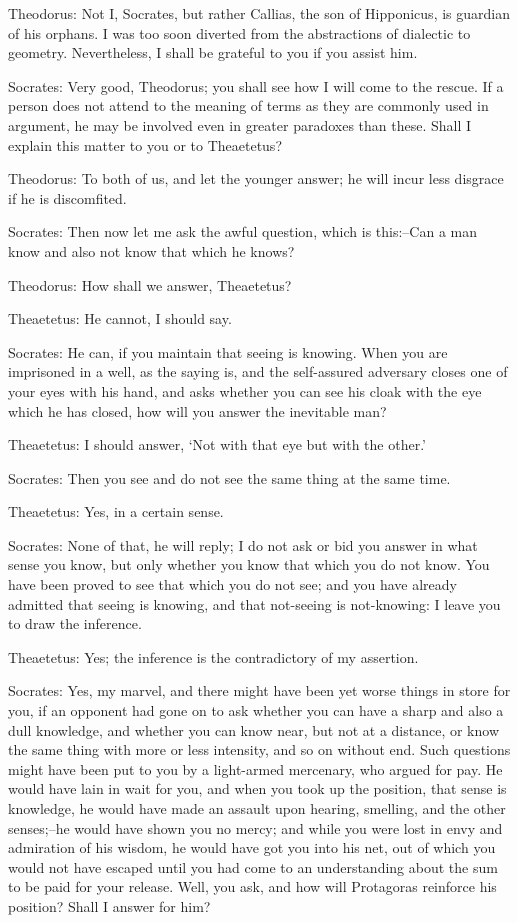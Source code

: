 Theodorus: Not I, Socrates, but rather Callias, the son of Hipponicus,
is guardian of his orphans. I was too soon diverted from the
abstractions of dialectic to geometry. Nevertheless, I shall be grateful
to you if you assist him.

Socrates: Very good, Theodorus; you shall see how I will come to the
rescue. If a person does not attend to the meaning of terms as they are
commonly used in argument, he may be involved even in greater paradoxes
than these. Shall I explain this matter to you or to Theaetetus?

Theodorus: To both of us, and let the younger answer; he will incur less
disgrace if he is discomfited.

Socrates: Then now let me ask the awful question, which is this:--Can a
man know and also not know that which he knows?

Theodorus: How shall we answer, Theaetetus?

Theaetetus: He cannot, I should say.

Socrates: He can, if you maintain that seeing is knowing. When you are
imprisoned in a well, as the saying is, and the self-assured adversary
closes one of your eyes with his hand, and asks whether you can see
his cloak with the eye which he has closed, how will you answer the
inevitable man?

Theaetetus: I should answer, `Not with that eye but with the other.'

Socrates: Then you see and do not see the same thing at the same time.

Theaetetus: Yes, in a certain sense.

Socrates: None of that, he will reply; I do not ask or bid you answer
in what sense you know, but only whether you know that which you do not
know. You have been proved to see that which you do not see; and you
have already admitted that seeing is knowing, and that not-seeing is
not-knowing: I leave you to draw the inference.

Theaetetus: Yes; the inference is the contradictory of my assertion.

Socrates: Yes, my marvel, and there might have been yet worse things in
store for you, if an opponent had gone on to ask whether you can have a
sharp and also a dull knowledge, and whether you can know near, but not
at a distance, or know the same thing with more or less intensity,
and so on without end. Such questions might have been put to you by a
light-armed mercenary, who argued for pay. He would have lain in wait
for you, and when you took up the position, that sense is knowledge,
he would have made an assault upon hearing, smelling, and the other
senses;--he would have shown you no mercy; and while you were lost in
envy and admiration of his wisdom, he would have got you into his
net, out of which you would not have escaped until you had come to an
understanding about the sum to be paid for your release. Well, you ask,
and how will Protagoras reinforce his position? Shall I answer for him?

